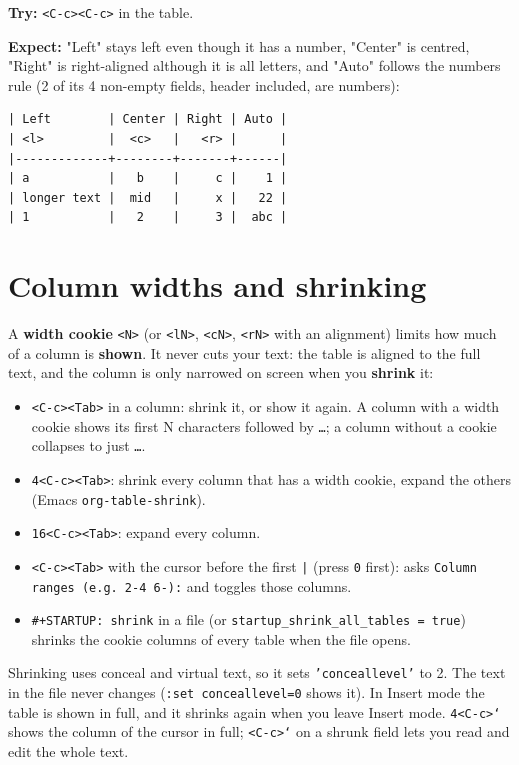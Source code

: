 \textbf{Try:} \texttt{<C-c><C-c>} in the table.

\textbf{Expect:} "Left" stays left even though it has a number, "Center" is
centred, "Right" is right-aligned although it is all letters, and "Auto"
follows the numbers rule (2 of its 4 non-empty fields, header included,
are numbers):
\begin{verbatim}
| Left        | Center | Right | Auto |
| <l>         |  <c>   |   <r> |      |
|-------------+--------+-------+------|
| a           |   b    |     c |    1 |
| longer text |  mid   |     x |   22 |
| 1           |   2    |     3 |  abc |
\end{verbatim}
\section{Column widths and shrinking}
\label{sec:org6030345}
A \textbf{width cookie} \texttt{<N>} (or \texttt{<lN>}, \texttt{<cN>}, \texttt{<rN>} with an alignment)
limits how much of a column is \textbf{shown}. It never cuts your text: the table
is aligned to the full text, and the column is only narrowed on screen when
you \textbf{shrink} it:

\begin{itemize}
\item \texttt{<C-c><Tab>} in a column: shrink it, or show it again. A column with a
width cookie shows its first N characters followed by \texttt{…}; a column
without a cookie collapses to just \texttt{…}.
\item \texttt{4<C-c><Tab>}: shrink every column that has a width cookie, expand the
others (Emacs \texttt{org-table-shrink}).
\item \texttt{16<C-c><Tab>}: expand every column.
\item \texttt{<C-c><Tab>} with the cursor before the first \texttt{|} (press \texttt{0} first):
asks \texttt{Column ranges (e.g. 2-4 6-):} and toggles those columns.
\item \texttt{\#+STARTUP: shrink} in a file (or \texttt{startup\_shrink\_all\_tables = true})
shrinks the cookie columns of every table when the file opens.
\end{itemize}

Shrinking uses conceal and virtual text, so it sets \texttt{'conceallevel'} to 2.
The text in the file never changes (\texttt{:set conceallevel=0} shows it). In
Insert mode the table is shown in full, and it shrinks again when you leave
Insert mode. \texttt{4<C-c>`} shows the column of the cursor in full; \texttt{<C-c>`} on
a shrunk field lets you read and edit the whole text.

